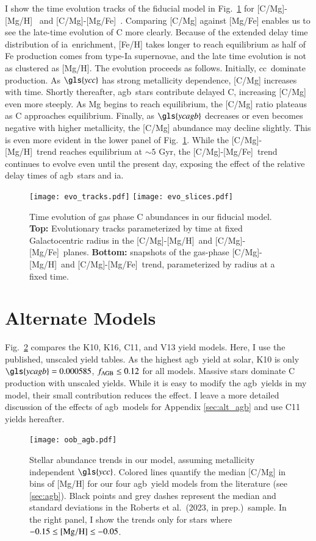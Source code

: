 \documentclass[12pt,oneside,letterpaper]{report}
\newcommand{\cc}{\gls{cc}}
\newcommand{\agb}{\gls{agb}}
\newcommand{\ia}{\gls{ia}}
\newcommand{\Ycc}{\gls{ycc}}
\newcommand{\Ycagb}{\gls{ycagb}}
\newcommand{\caah}{[C/Mg]-[Mg/H]}
\newcommand{\caafe}{[C/Mg]-[Mg/Fe]}
\newcommand{\citetjack}{Roberts et al.~(2023, in prep.)}
\newcommand{\about}[1]{${\sim} #1$}
\begin{document}
I show the time evolution tracks of the fiducial model in Fig.~\ref{fig:c_evo} for \caah~ and \caafe~. Comparing [C/Mg] against [Mg/Fe] enables us to see the late-time evolution of C more clearly. Because of the extended delay time distribution of \ia\ enrichment, [Fe/H] takes longer to reach equilibrium as half of Fe production comes from type-Ia supernovae, and the late time evolution is not as clustered as [Mg/H].
The evolution proceeds as follows.
Initially, \cc\ dominate production. As $\Ycc$ has strong metallicity dependence, [C/Mg] increases with time. Shortly thereafter, \agb\ stars contribute delayed C, increasing [C/Mg] even more steeply. As Mg begins to reach equilibrium, the [C/Mg] ratio plateaus as C approaches equilibrium. Finally, as $\Ycagb$ decreases or even becomes negative with higher metallicity, the [C/Mg] abundance may decline slightly. 
This is even more evident in the lower panel of Fig.~\ref{fig:c_evo}. While the \caah~trend reaches equilibrium at \about{5} Gyr, the \caafe~trend continues to evolve even until the present day, exposing the effect of the relative delay times of \agb\ stars and \ia.


\begin{figure}
\centering
\texttt{[image: evo\_tracks.pdf]}
\texttt{[image: evo\_slices.pdf]}
\caption[C chemical evolution tracks]{
    Time evolution of gas phase C abundances in our fiducial model.
    {\bf Top:} Evolutionary tracks parameterized by time at fixed Galactocentric radius in the \caah\ and \caafe\ planes. 
    {\bf Bottom:} snapshots of the gas-phase \caah\ and \caafe\ trend, parameterized by radius at a fixed time.
}
\label{fig:c_evo}
\end{figure}

\section{Alternate Models}\label{sec:f-z-models}

Fig.~\ref{fig:agb_sims} compares the K10, K16, C11, and V13 yield models. Here, I use the published, unscaled yield tables. As the highest \agb\ yield at solar, K10 is only $\Ycagb=0.000585$, $f_{\rm AGB} \leq 0.12$ for all models. Massive stars dominate C production with unscaled yields.  While it is easy to modify the \agb\ yields in my model, their small contribution reduces the effect. I leave a more detailed discussion of the effects of \agb\ models for Appendix \ref{sec:alt_agb} and use C11 yields hereafter.

\begin{figure}
\centering
\texttt{[image: oob\_agb.pdf]}
\caption[Mean stellar abundance trends]{
    Stellar abundance trends in our model, assuming metallicity independent $\Ycc$. Colored lines quantify the median [C/Mg] in bins of [Mg/H] for our four \agb\ yield models from the literature (see \ref{sec:agb}). Black points and grey dashes represent the median and standard deviations in the \citetjack~sample. In the right panel, I show the trends only for stars where $-0.15\leq {\rm [Mg/H]}\leq -0.05$.
}
\label{fig:agb_sims}
\end{figure}
\end{document}
